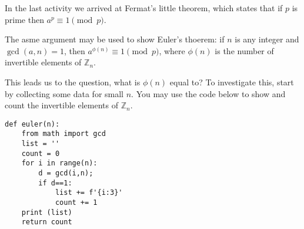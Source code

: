 \documentclass[12pt]{exam}
\newcommand{\Z}{\mathbb Z}
\begin{document}
\begin{questions}
  \question In the last activity we arrived at Fermat's little theorem, which states that if $p$ is prime then $a^p\equiv1\pmod{p}$.
  
  The asme argument may be used to show Euler's thoerem: if $n$ is any integer and $\gcd(a,n)=1$, then $a^{\phi(n)}\equiv1\pmod{p}$, where $\phi(n)$ is the number of invertible elements of $\Z_n$.
  
  This leads us to the question, what is $\phi(n)$ equal to? To investigate this, start by collecting some data for small $n$. You may use the code below to show and count the invertible elements of $\Z_n$.
  
  \begin{lstlisting}
def euler(n):
    from math import gcd
    list = ''
    count = 0
    for i in range(n):
        d = gcd(i,n);
        if d==1:
            list += f'{i:3}'
            count += 1
    print (list)
    return count
  \end{lstlisting}
  

\end{questions}
\end{document}
